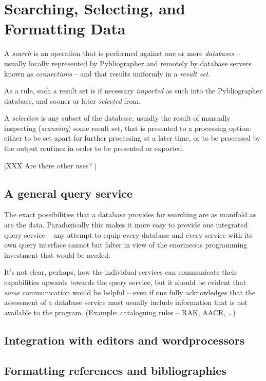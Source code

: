 
\section{Searching, Selecting, and Formatting Data}
\label{sec:processing}


A \textit{search} is an operation that is performed against one or
more \textit{databases} -- usually locally represented by
Pybliographer and remotely by database servers known as
\textit{connections} -- and that results uniformly in a \textit{result
  set}.

As a rule, such a result set is if necessary \textit{imported} as such
into the Pybliographer database, and sooner or later \textit{selected}
from.

A \textit{selection} is any subset of the database, usually the result
of manually inspecting (\textit{scanning}) some result set, that is
presented to a processing option: either to be set apart for further
processing at a later time, or to be processed by the output routines
in order to be presented or exported.

[XXX Are there other uses? ]



\subsection{A general query service}
\label{sec:genquery}

The exact possibilities that a database provides for searching are as
manifold as are the data. Paradoxically this makes it more easy to
provide one integrated query service -- any attempt to equip every
database and every service with its own query interface cannot but
falter in view of the enormeous programming investment that would be
needed.

It's not clear, perhaps, how the individual services can communicate
their capabilities upwards towards the query service, but it should be
evident that \textit{some} communication would be helpful -- even if
one fully acknowledges that the assessment of a database service must
usually include information that is not available to the
program. (Example: cataloguing rules -- RAK, AACR, \dots)


\subsection{Integration with editors and wordprocessors}
\label{sec:wpintegr}


\subsection{Formatting references  and bibliographies}
\label{sec:formatting}



